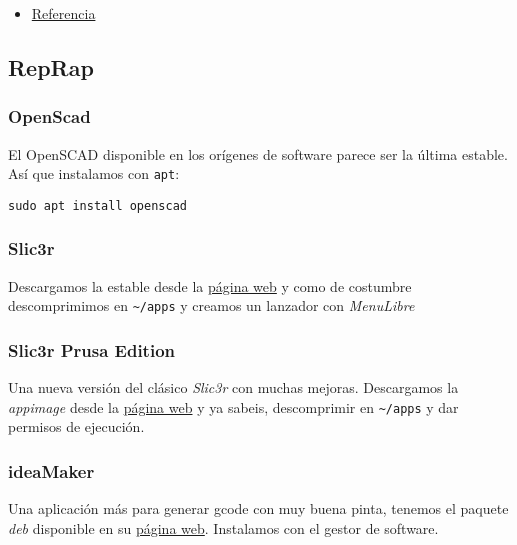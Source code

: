 \documentclass[
  12pt,
  spanish,
]{article}
\providecommand{\tightlist}{%
  \setlength{\itemsep}{0pt}\setlength{\parskip}{0pt}}
\begin{document}
\begin{itemize}
\tightlist
\item
  \href{https://docs.platformio.org/en/latest/installation.html\#piocore-install-shell-commands}{Referencia}
\end{itemize}

\hypertarget{reprap}{%
\subsection{RepRap}\label{reprap}}

\hypertarget{openscad}{%
\subsubsection{OpenScad}\label{openscad}}

El OpenSCAD disponible en los orígenes de software parece ser la última
estable. Así que instalamos con \texttt{apt}:

\begin{verbatim}
sudo apt install openscad
\end{verbatim}

\hypertarget{slic3r}{%
\subsubsection{Slic3r}\label{slic3r}}

Descargamos la estable desde la \href{https://dl.slic3r.org}{página web}
y como de costumbre descomprimimos en \texttt{\textasciitilde{}/apps} y
creamos un lanzador con \emph{MenuLibre}

\hypertarget{slic3r-prusa-edition}{%
\subsubsection{Slic3r Prusa Edition}\label{slic3r-prusa-edition}}

Una nueva versión del clásico \emph{Slic3r} con muchas mejoras.
Descargamos la \emph{appimage} desde la
\href{https://www.prusa3d.com/slic3r-prusa-edition/}{página web} y ya
sabeis, descomprimir en \texttt{\textasciitilde{}/apps} y dar permisos
de ejecución.

\hypertarget{ideamaker}{%
\subsubsection{ideaMaker}\label{ideamaker}}

Una aplicación más para generar gcode con muy buena pinta, tenemos el
paquete \emph{deb} disponible en su
\href{https://www.raise3d.com/pages/ideamaker}{página web}. Instalamos
con el gestor de software.
\end{document}
